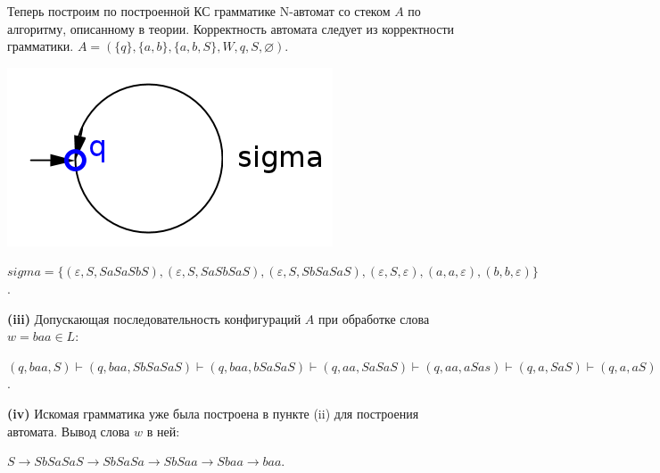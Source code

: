 \documentclass[10pt]{article}
\let \eps \varepsilon
\begin{document}
\smallskip

Теперь построим по построенной КС грамматике N-автомат со стеком $A$ по алгоритму, описанному в теории. Корректность автомата следует из корректности грамматики. $A = ( \{ q \}, \{ a, b \}, \{ a, b, S \}, W, q, S, \varnothing )$.

\centerline{\includegraphics{image-1.png}}

\noindent $sigma = \{ (\eps, S, SaSaSbS), (\eps, S, SaSbSaS), (\eps, S, SbSaSaS), (\eps, S, \eps), (a, a, \eps), (b, b, \eps) \}$.

\smallskip

{\bf (iii)} Допускающая последовательность конфигураций $A$ при обработке слова $w = baa \in L$:

$(q, baa, S) \vdash (q, baa, SbSaSaS) \vdash (q, baa, bSaSaS) \vdash (q, aa, SaSaS) \vdash (q, aa, aSas) \vdash (q, a, SaS) \vdash (q, a, aS) \vdash (q, \eps, S) \vdash (q, \eps, \eps)$.

\smallskip

{\bf (iv)} Искомая грамматика уже была построена в пункте (ii) для построения автомата. Вывод слова $w$ в ней:

$S \rightarrow SbSaSaS \rightarrow SbSaSa \rightarrow SbSaa \rightarrow Sbaa \rightarrow baa$.
\end{document}
